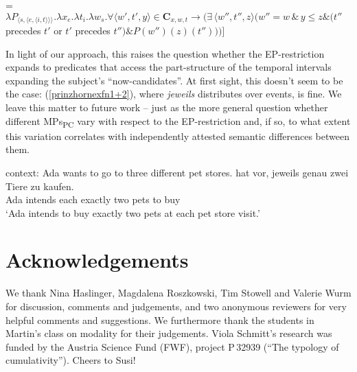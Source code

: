 \documentclass[output=paper,colorlinks,citecolor=brown,
]{langscibook}
\begin{document}
\ea {} = $\lambda P_{\langle s, \langle e, \langle i,t \rangle \rangle \rangle}. \lambda x_{e}. \lambda t_{i}. \lambda w_{s}. \forall \langle w',t',y \rangle \in \textbf{C}_{x,w,t} \rightarrow (\exists\, \langle w'', t'', z \rangle (w'' = w \, \& \, y \le z \& (t''$ precedes $t'$ or $t'$ precedes $t'') \& P(w'')(z)(t'')))]$
 \label{prinzhornhazel}\z  
 
In light of our approach, this raises the question whether the EP-restriction expands to predicates that access the part-structure of the temporal intervals expanding the subject's “now-candidates”. At first sight, this doesn't seem to be the case:   (\ref{prinzhornexfn1+2}), where \textit{jeweils} distributes over events, is fine. We leave this matter to future work -- just as the more general question  whether different MPs\textsubscript{PC} vary with respect to the EP-restriction and, if so, to what extent this variation correlates with independently attested semantic differences between them.
 
\ea \label{prinzhornexfn1+2}
\ea \label{prinzhornexfn1} {\sc context: } Ada wants to go to three different pet stores.
\ex {} {hat vor}, {jeweils} {genau} {zwei} {Tiere} {zu} {kaufen}.\\
   Ada intends {} each exactly two pets to buy \\
\glt `Ada intends to buy exactly two pets at each pet store visit.' \label{prinzhornexfn2}
\z \z




\section*{Acknowledgements}
\begin{sloppypar}
We thank Nina Haslinger, Magdalena Roszkowski, Tim Stowell and Valerie Wurm for discussion, comments and judgements, and two anonymous reviewers for very helpful comments and suggestions. We furthermore thank the students in Martin's class on modality for their judgements. Viola Schmitt's research was funded by the Austria Science Fund (FWF), project  P\,32939 (“The typology of cumulativity”). Cheers to Susi!
\end{sloppypar}

\printbibliography[heading=subbibliography,notkeyword=this]
\end{document}
